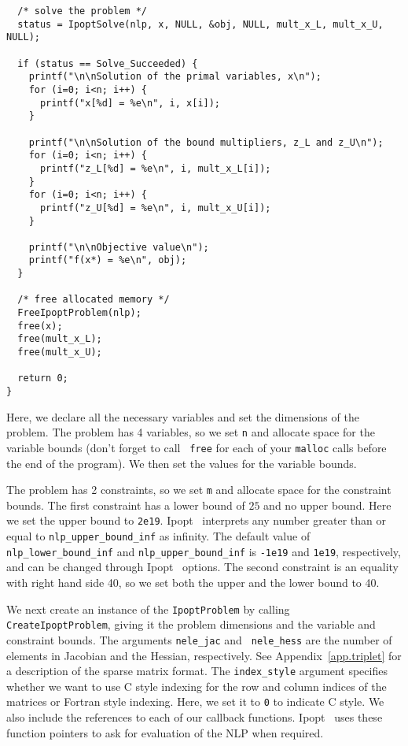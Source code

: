 \documentclass[10pt]{article}
\newcommand{\Ipopt}{{\sc Ipopt }}
\begin{document}
\begin{footnotesize}
\begin{verbatim}
  /* solve the problem */
  status = IpoptSolve(nlp, x, NULL, &obj, NULL, mult_x_L, mult_x_U, NULL);

  if (status == Solve_Succeeded) {
    printf("\n\nSolution of the primal variables, x\n");
    for (i=0; i<n; i++) {
      printf("x[%d] = %e\n", i, x[i]); 
    }

    printf("\n\nSolution of the bound multipliers, z_L and z_U\n");
    for (i=0; i<n; i++) {
      printf("z_L[%d] = %e\n", i, mult_x_L[i]); 
    }
    for (i=0; i<n; i++) {
      printf("z_U[%d] = %e\n", i, mult_x_U[i]); 
    }

    printf("\n\nObjective value\n");
    printf("f(x*) = %e\n", obj); 
  }
 
  /* free allocated memory */
  FreeIpoptProblem(nlp);
  free(x);
  free(mult_x_L);
  free(mult_x_U);

  return 0;
}
\end{verbatim}
\end{footnotesize}

Here, we declare all the necessary variables and set the dimensions of
the problem.  The problem has 4 variables, so we set {\tt n} and
allocate space for the variable bounds (don't forget to call {\tt
  free} for each of your {\tt malloc} calls before the end of the
program). We then set the values for the variable bounds.

The problem has 2 constraints, so we set {\tt m} and allocate space
for the constraint bounds. The first constraint has a lower bound of
$25$ and no upper bound.  Here we set the upper bound to
\texttt{2e19}. \Ipopt\ interprets any number greater than or equal to
\texttt{nlp\_upper\_bound\_inf} as infinity. The default value of
\texttt{nlp\_lower\_bound\_inf} and \texttt{nlp\_upper\_bound\_inf} is
\texttt{-1e19} and \texttt{1e19}, respectively, and can be changed
through \Ipopt\ options.  The second constraint is an equality with
right hand side 40, so we set both the upper and the lower bound to
40.

We next create an instance of the {\tt IpoptProblem} by calling {\tt
CreateIpoptProblem}, giving it the problem dimensions and the variable
and constraint bounds. The arguments {\tt nele\_jac} and {\tt
nele\_hess} are the number of elements in Jacobian and the Hessian,
respectively. See Appendix~\ref{app.triplet} for a description of the
sparse matrix format. The {\tt index\_style} argument specifies whether
we want to use C style indexing for the row and column indices of the
matrices or Fortran style indexing. Here, we set it to {\tt 0} to
indicate C style.  We also include the references to each of our
callback functions. \Ipopt\ uses these function pointers to ask for
evaluation of the NLP when required.
\end{document}
